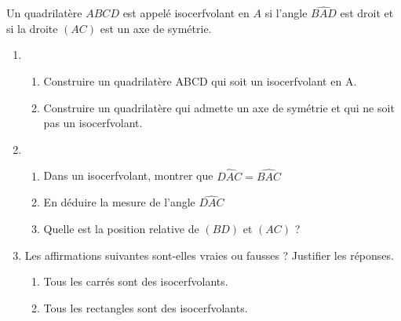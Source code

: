 \begin{colonne*exercice}
\bigskip


\begin{exercice} %
   Un quadrilatère $ABCD$ est appelé isocerfvolant en $A$ si l'angle $\widehat{BAD}$ est droit et si la droite $(AC)$ est un axe de symétrie.
   \begin{enumerate}
      \item
      \begin{enumerate}
         \item Construire un quadrilatère ABCD qui soit un isocerfvolant en A.
         \item Construire un quadrilatère qui admette un axe de symétrie et qui ne soit pas un isocerfvolant.
      \end{enumerate}
      \item
      \begin{enumerate}
         \item Dans un isocerfvolant, montrer que $\widehat{DAC} =\widehat{BAC}$
         \item En déduire la mesure de l'angle $\widehat{DAC}$
         \item Quelle est la position relative de $(BD)$ et $(AC)$ ?
      \end{enumerate}
      \item Les affirmations suivantes sont-elles vraies ou fausses ? Justifier les réponses.
      \begin{enumerate}
         \item Tous les carrés sont des isocerfvolants.
         \item Tous les rectangles sont des isocerfvolants.
      \end{enumerate}
   \end{enumerate}
\end{exercice}


\end{colonne*exercice}
